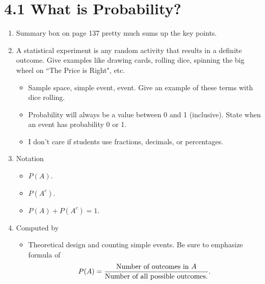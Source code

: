 \documentclass{article}
\begin{document}
\section*{4.1 What is Probability?}

\begin{enumerate}

    \item Summary box on page 137 pretty much sums up the key points.

    \item A statistical experiment is any random activity that results in a definite outcome. Give examples like drawing cards, rolling dice, spinning the big wheel on ``The Price is Right", etc.
    
        \begin{itemize}
            
            \item Sample space, simple event, event. Give an example of these terms with dice rolling.
            
            \item Probability will always be a value between 0 and 1 (inclusive). State when an event has probability 0 or 1.
            
            \item I don’t care if students use fractions, decimals, or percentages.
            
        \end{itemize}
        
    \item Notation
    
        \begin{itemize}
            
            \item $P(A)$.
            
            \item $P(A^c)$.
            
            \item $P(A)+P(A^c)=1$.
            
        \end{itemize}
        
    \item Computed by
    
        \begin{itemize}
        
            \item Theoretical design and counting simple events.  Be sure to emphasize formula of $$P(A)=\frac{\textnormal{Number of outcomes in } A}{\textnormal{Number of all possible outcomes.}}.$$
            

\end{itemize}
\end{enumerate}
\end{document}
